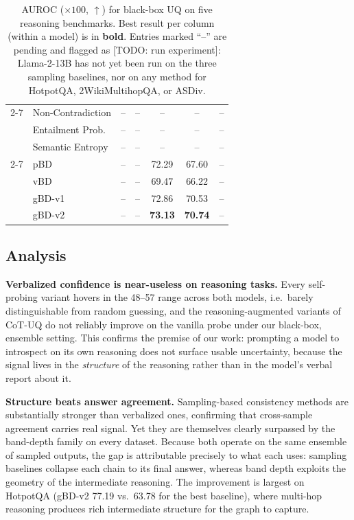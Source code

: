\documentclass[11pt]{article}
\begin{document}
\begin{table}[htbp]
{\begin{tabular}{c l cc ccc}
    \cmidrule(lr){2-7}
      & Non-Contradiction       & --    & --    & --    & --    & -- \\
      & Entailment Prob.        & --    & --    & --    & --    & -- \\
      & Semantic Entropy        & --    & --    & --    & --    & -- \\
    \cmidrule(lr){2-7}
      & pBD                     & --    & --    & 72.29 & 67.60 & -- \\
      & vBD                     & --    & --    & 69.47 & 66.22 & -- \\
      & gBD-v1                  & --    & --    & 72.86 & 70.53 & -- \\
      & gBD-v2                  & --    & --    & \textbf{73.13} & \textbf{70.74} & -- \\
    \bottomrule
  \end{tabular}%
  }
  \caption{AUROC ($\times 100$, $\uparrow$) for black-box UQ on five reasoning
  benchmarks. Best result per column (within a model) is in \textbf{bold}.
  Entries marked ``--'' are pending and flagged as [TODO: run experiment]:
  Llama-2-13B has not yet been run on the three sampling baselines, nor on any
  method for HotpotQA, 2WikiMultihopQA, or ASDiv.}
  \label{tab:main-results}
\end{table}

\subsection{Analysis}
\label{sec:exp:analysis}

\textbf{Verbalized confidence is near-useless on reasoning tasks.} Every
self-probing variant hovers in the 48--57 range across both models, i.e.\ barely
distinguishable from random guessing, and the reasoning-augmented variants of
CoT-UQ do not reliably improve on the vanilla probe under our black-box,
ensemble setting. This confirms the premise of our work: prompting a model to
introspect on its own reasoning does not surface usable uncertainty, because the
signal lives in the \emph{structure} of the reasoning rather than in the model's
verbal report about it.

\textbf{Structure beats answer agreement.} Sampling-based consistency methods are
substantially stronger than verbalized ones, confirming that cross-sample
agreement carries real signal. Yet they are themselves clearly surpassed by the
band-depth family on every dataset. Because both operate on the same ensemble of
sampled outputs, the gap is attributable precisely to what each uses: sampling
baselines collapse each chain to its final answer, whereas band depth exploits
the geometry of the intermediate reasoning. The improvement is largest on
HotpotQA (gBD-v2 77.19 vs.\ 63.78 for the best baseline), where multi-hop
reasoning produces rich intermediate structure for the graph to capture.
\end{document}
